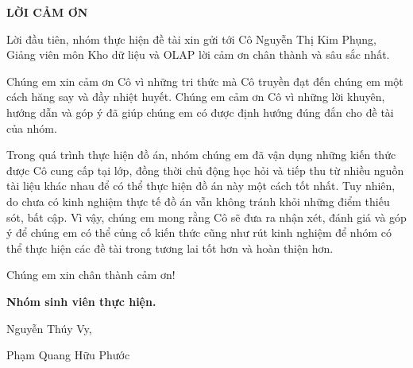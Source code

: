 \vspace*{0.5cm}

\begin{center}
    {\Large \bfseries LỜI CẢM ƠN}
\end{center}

\vspace*{0.5cm}

{\large
\linespread{1.35}\selectfont
\setlength{\parindent}{2em}
\setlength{\parskip}{1em}

Lời đầu tiên, nhóm thực hiện đề tài xin gửi tới Cô Nguyễn Thị Kim Phụng, Giảng viên môn Kho dữ liệu và OLAP lời cảm ơn chân thành và sâu sắc nhất.

Chúng em xin cảm ơn Cô vì những tri thức mà Cô truyền đạt đến chúng em một cách hăng say và đầy nhiệt huyết. Chúng em cảm ơn Cô vì những lời khuyên, hướng dẫn và góp ý đã giúp chúng em có được định hướng đúng đắn cho đề tài của nhóm.

Trong quá trình thực hiện đồ án, nhóm chúng em đã vận dụng những kiến thức được Cô cung cấp tại lớp, đồng thời chủ động học hỏi và tiếp thu từ nhiều nguồn tài liệu khác nhau để có thể thực hiện đồ án này một cách tốt nhất. Tuy nhiên, do chưa có kinh nghiệm thực tế đồ án vẫn không tránh khỏi những điểm thiếu sót, bất cập. Vì vậy, chúng em mong rằng Cô sẽ đưa ra nhận xét, đánh giá và góp ý để chúng em có thể củng cố kiến thức cũng như rút kinh nghiệm để nhóm có thể thực hiện các đề tài trong tương lai tốt hơn và hoàn thiện hơn.

Chúng em xin chân thành cảm ơn!
\par}

\vspace{2cm}

\begin{flushright}
    {\large \textbf{Nhóm sinh viên thực hiện.}}

    
    Nguyễn Thúy Vy,

    
    Phạm Quang Hữu Phước
\end{flushright}
